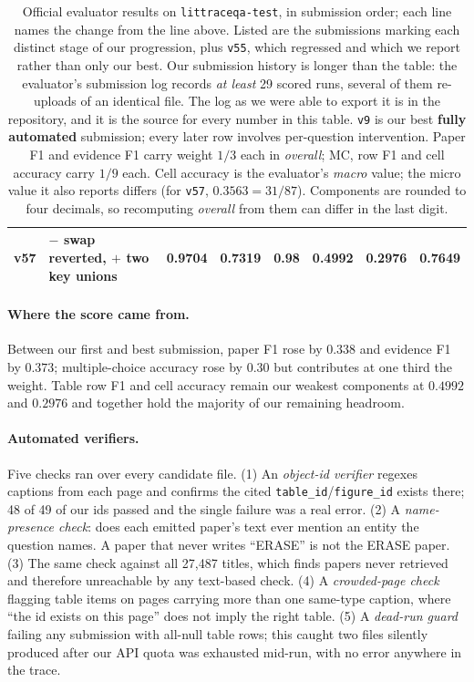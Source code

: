 \documentclass[11pt]{article}
\newcommand{\bk}{\allowbreak}
\begin{document}
\begin{table}[t]
\begin{tabular}{llrrrrrr}
v57 & \;$-$ swap reverted, $+$ two key unions   & \textbf{0.9704} & \textbf{0.7319} & \textbf{0.98} & \textbf{0.4992} & \textbf{0.2976} & \textbf{0.7649} \\
\bottomrule
\end{tabular}
\caption{Official evaluator results on \texttt{littraceqa-\bk{}test}, in submission
order; each line names the change from the line above. Listed are the submissions
marking each distinct stage of our progression, plus \texttt{v55}, which
regressed and which we report rather than only our best. Our submission history
is longer than the table: the evaluator's submission log records \emph{at least}
29 scored runs, several of them re-uploads of an identical file. The log as we
were able to export it is in the repository, and it is the source for every
number in this table. \texttt{v9} is our best \textbf{fully automated}
submission; every
later row involves per-question intervention. Paper F1 and evidence F1 carry
weight $1/3$ each in \emph{overall}; MC, row F1 and cell accuracy carry $1/9$
each. Cell accuracy is the evaluator's \emph{macro} value; the micro value it
also reports differs (for \texttt{v57}, $0.3563 = 31/87$). Components are rounded
to four decimals, so recomputing \emph{overall} from them can differ in the last
digit.}
\label{tab:results}
\end{table}

\paragraph{Where the score came from.}
Between our first and best submission, paper F1 rose by $0.338$ and evidence F1
by $0.373$; multiple-choice accuracy rose by $0.30$ but contributes at one third
the weight. Table row F1 and cell accuracy remain our weakest components at
$0.4992$ and $0.2976$ and together hold the majority of our remaining headroom.

\paragraph{Automated verifiers.}
Five checks ran over every candidate file. (1) An \emph{object-id verifier} regexes captions from each page and
confirms the cited \texttt{table\_id}/\texttt{figure\_id} exists there; 48 of 49
of our ids passed and the single failure was a real error. (2) A
\emph{name-presence check}: does each emitted paper's text ever mention an entity
the question names. A paper that never writes ``ERASE'' is not the ERASE
paper. (3) The same check against all 27{,}487 titles, which finds papers never
retrieved and therefore unreachable by any text-based check. (4) A
\emph{crowded-page check} flagging table items on pages carrying more than one
same-type caption, where ``the id exists on this page'' does not imply the right
table. (5) A \emph{dead-run guard} failing any submission with all-null table
rows; this caught two files silently produced after our API quota was exhausted
mid-run, with no error anywhere in the trace.
\end{document}
